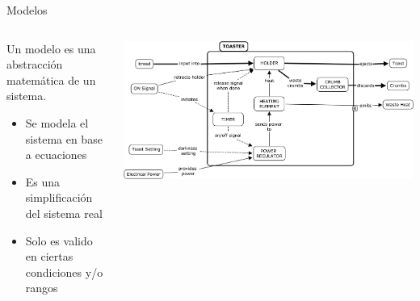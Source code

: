 \documentclass[aspectratio=169]{beamer}
\begin{document}
\begin{frame}{Modelos}
    \begin{columns}[onlytextwidth]
        \begin{column}{0.5\textwidth}
        Un modelo es una abstracción matemática de un sistema.\\[8pt]
        \begin{itemize}
            \item Se modela el sistema en base a ecuaciones
            \item Es una simplificación del sistema real
            \item Solo es valido en ciertas condiciones y/o rangos
        \end{itemize}
        
        
        \end{column}
        \begin{column}{0.5\textwidth}
            \begin{center}
               \includegraphics[width=\textwidth]{fig/tostadora.jpg}
            \end{center}
        \end{column}
    \end{columns}
\end{frame}
\end{document}
